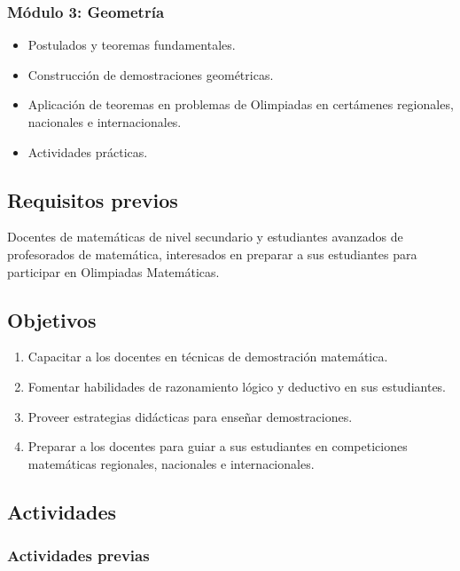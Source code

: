 \subsubsection{Módulo 3: Geometría}
\begin{itemize}
	\item Postulados y teoremas fundamentales.
	\item Construcción de demostraciones geométricas.
	\item Aplicación de teoremas en problemas de Olimpiadas en certámenes regionales, nacionales e internacionales.
	\item Actividades prácticas.
\end{itemize}

\subsection{Requisitos previos}

Docentes de matemáticas de nivel secundario y estudiantes avanzados de profesorados de matemática, interesados en preparar a sus estudiantes para participar en Olimpiadas Matemáticas.

\subsection{Objetivos}
\begin{enumerate}
	\item Capacitar a los docentes en técnicas de demostración matemática.
	\item Fomentar habilidades de razonamiento lógico y deductivo en sus estudiantes.
	\item Proveer estrategias didácticas para enseñar demostraciones.
	\item Preparar a los docentes para guiar a sus estudiantes en competiciones matemáticas regionales, nacionales e internacionales.
\end{enumerate}

\subsection{Actividades}

\subsubsection{Actividades previas}

